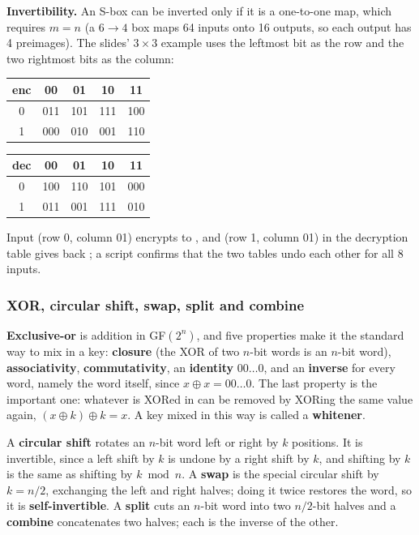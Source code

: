 \textbf{Invertibility.} An S-box can be inverted only if it is a one-to-one map, which requires $m = n$ (a $6 \to 4$ box maps 64 inputs onto 16 outputs, so each output has 4 preimages). The slides' $3 \times 3$ example uses the leftmost bit as the row and the two rightmost bits as the column:
\begin{center}\small
\begin{tabular}{@{}c|cccc@{}}
enc & 00 & 01 & 10 & 11\\ \midrule
0 & 011 & 101 & 111 & 100\\
1 & 000 & 010 & 001 & 110\\
\end{tabular}
\qquad
\begin{tabular}{@{}c|cccc@{}}
dec & 00 & 01 & 10 & 11\\ \midrule
0 & 100 & 110 & 101 & 000\\
1 & 011 & 001 & 111 & 010\\
\end{tabular}
\end{center}
Input  (row 0, column 01) encrypts to , and  (row 1, column 01) in the decryption table gives back ; a script confirms that the two tables undo each other for all 8 inputs.

\subsubsection*{XOR, circular shift, swap, split and combine}
\textbf{Exclusive-or} is addition in GF$(2^n)$, and five properties make it the standard way to mix in a key: \textbf{closure} (the XOR of two $n$-bit words is an $n$-bit word), \textbf{associativity}, \textbf{commutativity}, an \textbf{identity} $00\dots0$, and an \textbf{inverse} for every word, namely the word itself, since $x \oplus x = 00\dots0$. The last property is the important one: whatever is XORed in can be removed by XORing the same value again, $(x \oplus k) \oplus k = x$. A key mixed in this way is called a \textbf{whitener}.

A \textbf{circular shift} rotates an $n$-bit word left or right by $k$ positions. It is invertible, since a left shift by $k$ is undone by a right shift by $k$, and shifting by $k$ is the same as shifting by $k \bmod n$. A \textbf{swap} is the special circular shift by $k = n/2$, exchanging the left and right halves; doing it twice restores the word, so it is \textbf{self-invertible}. A \textbf{split} cuts an $n$-bit word into two $n/2$-bit halves and a \textbf{combine} concatenates two halves; each is the inverse of the other.


